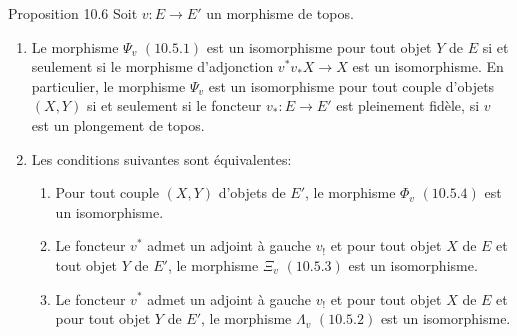 \begin{enonce*}{Proposition 10.6}
Soit $v:E\rightarrow E'$ un morphisme de topos.
\begin{enumerate}
\renewcommand{\labelenumi}{\theenumi)}
\item Le morphisme $\Psi_v$ $(\hyperref[IV.subsubsec10.5.1]{10.5.1})$ est un
  isomorphisme pour tout
objet $Y$ de $E$ si et seulement si le morphisme d'adjonction
$v^{\ast}v_{\ast}X\rightarrow X$ est un isomorphisme. En
particulier, le morphisme $\Psi_v$ est un isomorphisme pour tout
couple d'objets $(X,Y)$ si et seulement si le foncteur
$v_{\ast}:E\rightarrow E'$ est pleinement fidèle, \ie si $v$ est un
plongement de topos.

\item Les conditions suivantes sont équivalentes:
\begin{enumerate}
\renewcommand{\theenumii}{\roman{enumii}}
\renewcommand{\labelenumii}{(\theenumii)}
\item Pour tout couple $(X,Y)$ d'objets de $E'$, le morphisme $\Phi_v$
$(\hyperref[IV.subsubsec10.5.4]{10.5.4})$ est un isomorphisme.

\item Le foncteur $v^{\ast}$ admet un adjoint à gauche $v_{!}$ et pour
tout objet $X$ de $E$ et tout objet $Y$ de $E'$, le morphisme
$\Xi_v$ $(\hyperref[IV.subsubsec10.5.3]{10.5.3})$ est un isomorphisme.

\item Le foncteur $v^{\ast}$ admet un adjoint à gauche $v_{!}$ et pour
tout objet $X$ de $E$ et pour tout objet $Y$ de $E'$, le morphisme
$\Lambda_v$ $(\hyperref[IV.subsubsec10.5.2]{10.5.2})$ est un isomorphisme.
\end{enumerate}
\end{enumerate}
\end{enonce*}

\setcounter{subsection}{6} \setcounter{subsubsection}{0}
